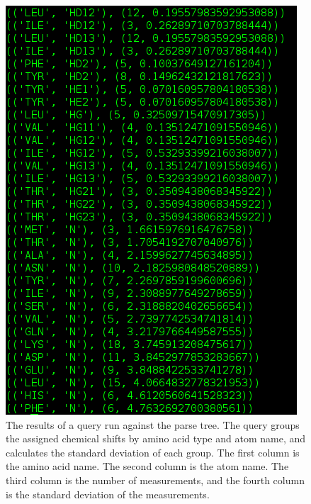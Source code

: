 \begin{figure}
  \includegraphics[scale=0.5]{figures/nmrpystar_query}
  \caption[The results of a query run against the parse tree]
          {The results of a query run against the parse tree.
           The query groups the assigned chemical shifts by
           amino acid type and atom name, and calculates the 
           standard deviation of each group.  The first column
           is the amino acid name.  The second column is the atom name.
           The third column is the number of measurements, and
           the fourth column is the standard deviation of the
           measurements.}
  \label{nmrpystar_query}
\end{figure}

